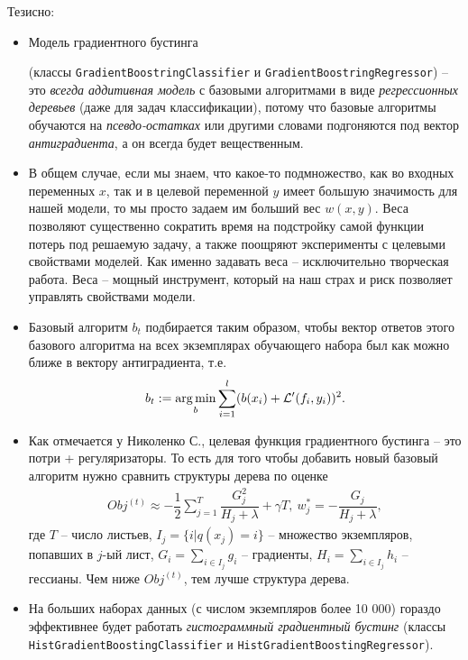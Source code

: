 \documentclass[%
	11pt,
	a4paper,
	utf8,
		]{article}
\begin{document}
Тезисно:
\begin{itemize}
	\item Модель градиентного бустинга
	
	(классы \verb|GradientBoostringClassifier| и \verb|GradientBoostringRegressor|) -- это \emph{всегда аддитивная модель} с базовыми алгоритмами в виде \emph{регрессионных деревьев} (даже для задач классификации), потому что базовые алгоритмы обучаются на \emph{псевдо-остатках} или другими словами подгоняются под вектор \emph{антиградиента}, а он всегда будет вещественным.
	
	\item В общем случае, если мы знаем, что какое-то подмножество, как во входных переменных $ x $, так и в целевой переменной $ y $ имеет большую значимость для нашей модели, то мы просто задаем им больший вес $ w(x, y) $. Веса позволяют существенно сократить время на подстройку самой функции потерь под решаемую задачу, а также поощряют эксперименты с целевыми свойствами моделей. Как именно задавать веса -- исключительно творческая работа. Веса -- мощный инструмент, который на наш страх и риск позволяет управлять свойствами модели.
	
	\item Базовый алгоритм $ b_t $ подбирается таким образом, чтобы вектор ответов этого базового алгоритма на всех экземплярах обучающего набора был как можно ближе в вектору антиградиента, т.е. 
\begin{align*}
	b_t := \operatorname*{arg\,min}_b \sum_{i=1}^{l} (b(x_i) + \mathcal{L}'(f_i, y_i))^2.
\end{align*}

    \item Как отмечается у Николенко С., целевая функция градиентного бустинга -- это потри + регуляризаторы. То есть для того чтобы добавить новый базовый алгоритм нужно сравнить структуры дерева по оценке
\begin{align*}
	Obj^{(t)} \approx - \dfrac{1}{2} \sum_{j=1}^{T} \dfrac{G_j^2}{H_j + \lambda} + \gamma T, \ w_j^* = - \dfrac{G_j}{H_j + \lambda},
\end{align*}
где $ T $ -- число листьев, $ I_j = \{i | q(x_j) = i\} $ -- множество экземпляров, попавших в $ j $-ый лист, $ G_i = \sum_{i \in I_j} g_i $ -- градиенты, $ H_i = \sum_{i \in I_j} h_i $ -- гессианы. Чем ниже $ Obj^{(t)} $, тем лучше структура дерева.
	
	\item На больших наборах данных (с числом экземпляров более 10 000) гораздо эффективнее будет работать \emph{гистограммный градиентный бустинг} (классы \verb|HistGradientBoostingClassifier| и \verb|HistGradientBoostingRegressor|).
	

\end{itemize}
\end{document}
